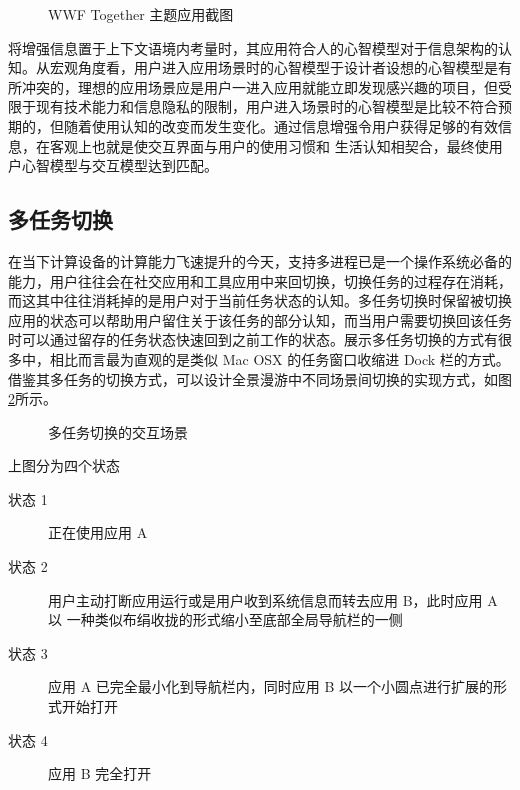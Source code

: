 \begin{figure}[htp]
\centering
{}
\caption{WWF Together 主题应用截图}
\label{fig:wwf}
\end{figure}

将增强信息置于上下文语境内考量时，其应用符合人的心智模型对于信息架构的认知。从宏观角度看，用户进入应用场景时的心智模型于设计者设想的心智模型是有所冲突的，理想的应用场景应是用户一进入应用就能立即发现感兴趣的项目，但受限于现有技术能力和信息隐私的限制，用户进入场景时的心智模型是比较不符合预期的，但随着使用认知的改变而发生变化。通过信息增强令用户获得足够的有效信息，在客观上也就是使交互界面与用户的使用习惯和 生活认知相契合，最终使用户心智模型与交互模型达到匹配。

\subsection{多任务切换}
在当下计算设备的计算能力飞速提升的今天，支持多进程已是一个操作系统必备的能力，用户往往会在社交应用和工具应用中来回切换，切换任务的过程存在消耗，而这其中往往消耗掉的是用户对于当前任务状态的认知。多任务切换时保留被切换应用的状态可以帮助用户留住关于该任务的部分认知，而当用户需要切换回该任务时可以通过留存的任务状态快速回到之前工作的状态。展示多任务切换的方式有很多中，相比而言最为直观的是类似 Mac OSX 的任务窗口收缩进 Dock 栏的方式。借鉴其多任务的切换方式，可以设计全景漫游中不同场景间切换的实现方式，如图\ref{fig:multitask}所示。

\begin{figure}[htp]
\centering
{}
\caption{多任务切换的交互场景}
\label{fig:multitask}
\end{figure}

上图分为四个状态
\begin{description}
	\item [状态 1] 正在使用应用 A
	\item [状态 2]用户主动打断应用运行或是用户收到系统信息而转去应用 B，此时应用 A 以 一种类似布绢收拢的形式缩小至底部全局导航栏的一侧
	\item [状态 3] 应用 A 已完全最小化到导航栏内，同时应用 B 以一个小圆点进行扩展的形式开始打开
	\item [状态 4] 应用 B 完全打开
\end{description}

